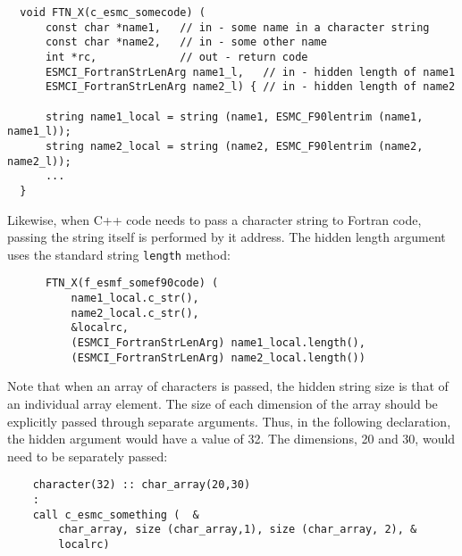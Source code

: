 \begin{verbatim}
  void FTN_X(c_esmc_somecode) (
      const char *name1,   // in - some name in a character string
      const char *name2,   // in - some other name
      int *rc,             // out - return code
      ESMCI_FortranStrLenArg name1_l,   // in - hidden length of name1
      ESMCI_FortranStrLenArg name2_l) { // in - hidden length of name2

      string name1_local = string (name1, ESMC_F90lentrim (name1, name1_l));
      string name2_local = string (name2, ESMC_F90lentrim (name2, name2_l));
      ...
  }
\end{verbatim}

Likewise, when C++ code needs to pass a character string to Fortran code,
passing the string itself is performed by it address.  The hidden length
argument uses the standard string {\tt length} method:

\begin{verbatim}
      FTN_X(f_esmf_somef90code) (
          name1_local.c_str(),
          name2_local.c_str(),
          &localrc,
          (ESMCI_FortranStrLenArg) name1_local.length(),
          (ESMCI_FortranStrLenArg) name2_local.length())
\end{verbatim}

Note that when an array of characters is passed, the hidden string size is
that of an individual array element.  The size of each dimension of the array
should be explicitly passed through separate arguments.  Thus, in the following
declaration, the hidden argument would have a value of 32.  The dimensions, 20
and 30, would need to be separately passed:

\begin{verbatim}
    character(32) :: char_array(20,30)
    :
    call c_esmc_something (  &
        char_array, size (char_array,1), size (char_array, 2), &
        localrc)
\end{verbatim}















